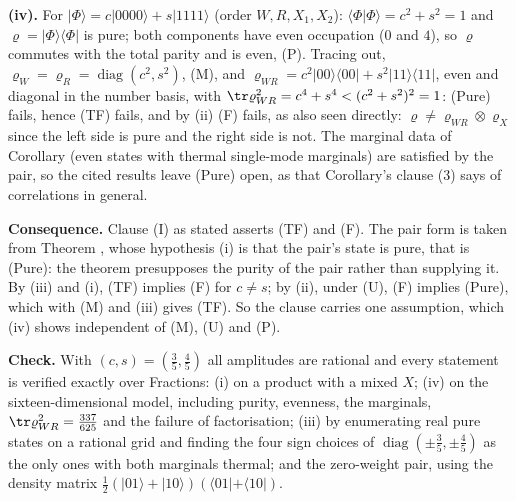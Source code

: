 \textbf{(iv).} For $|\Phi\rangle = c|0000\rangle + s|1111\rangle$ (order $W, R, X_1, X_2$): $\langle\Phi|\Phi\rangle = c^{2} + s^{2} = 1$ and $\varrho = |\Phi\rangle\langle\Phi|$ is pure; both components have even occupation ($0$ and $4$), so $\varrho$ commutes with the total parity and is even, (P). Tracing out, $\varrho_W = \varrho_R = \operatorname{diag}(c^{2}, s^{2})$, (M), and $\varrho_{WR} = c^{2}|00\rangle\langle00| + s^{2}|11\rangle\langle11|$, even and diagonal in the number basis, with $\tr\varrho_{WR}^{2} = c^{4} + s^{4} < (c^{2} + s^{2})^{2} = 1$: (Pure) fails, hence (TF) fails, and by (ii) (F) fails, as also seen directly: $\varrho \neq \varrho_{WR}\otimes\varrho_X$ since the left side is pure and the right side is not. The marginal data of Corollary  (even states with thermal single-mode marginals) are satisfied by the pair, so the cited results leave (Pure) open, as that Corollary's clause (3) says of correlations in general.

\textbf{Consequence.} Clause (I) as stated asserts (TF) and (F). The pair form is taken from Theorem , whose hypothesis (i) is that the pair's state is pure, that is (Pure): the theorem presupposes the purity of the pair rather than supplying it. By (iii) and (i), (TF) implies (F) for $c \neq s$; by (ii), under (U), (F) implies (Pure), which with (M) and (iii) gives (TF). So the clause carries one assumption, which (iv) shows independent of (M), (U) and (P).

\textbf{Check.} With $(c, s) = (\tfrac35, \tfrac45)$ all amplitudes are rational and every statement is verified exactly over Fractions: (i) on a product with a mixed $X$; (iv) on the sixteen-dimensional model, including purity, evenness, the marginals, $\tr\varrho_{WR}^{2} = \tfrac{337}{625}$ and the failure of factorisation; (iii) by enumerating real pure states on a rational grid and finding the four sign choices of $\operatorname{diag}(\pm\tfrac35, \pm\tfrac45)$ as the only ones with both marginals thermal; and the zero-weight pair, using the density matrix $\tfrac12(|01\rangle + |10\rangle)(\langle01| + \langle10|)$.
